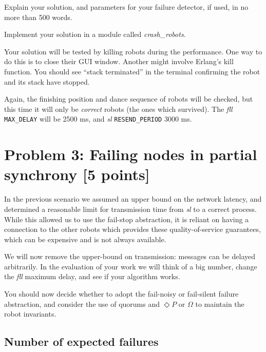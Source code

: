 \documentclass[a4paper]{article}
\begin{document}
Explain your solution, and parameters for your failure detector, if used, in
no more than 500 words.

Implement your solution in a module called \emph{crash\_robots}.

Your solution will be tested by killing robots during the performance. One way
to do this is to close their GUI window. Another might involve Erlang's kill
function. You should see ``stack terminated'' in the terminal confirming the
robot and its stack have stopped.

Again, the finishing position and dance sequence of robots will be checked,
but this time it will only be \emph{correct} robots (the ones which survived).
The \emph{fll} \verb!MAX_DELAY! will be 2500 ms, and \emph{sl}
\verb!RESEND_PERIOD! 3000 ms.















\section*{Problem 3: Failing nodes in partial synchrony [5 points]} %
\label{sec:problem_3_partial_synchrony}

In the previous scenario we assumed an upper bound on the network latency, and
determined a reasonable limit for transmission time from \emph{sl} to a
correct process. While this allowed us to use the fail-stop abstraction, it is
reliant on having a connection to the other robots which provides these
quality-of-service guarantees, which can be expensive and is not always
available.

We will now remove the upper-bound on transmission: messages can be delayed
arbitrarily. In the evaluation of your work we will think of a big number,
change the \emph{fll} maximum delay, and see if your algorithm works.

You should now decide whether to adopt the fail-noisy or fail-silent failure
abstraction, and consider the use of quorums and $\Diamond P$ or $\Omega$ to
maintain the robot invariants.

\subsection*{Number of expected failures} %
\label{sub:number_of_expected_failures}
\end{document}
